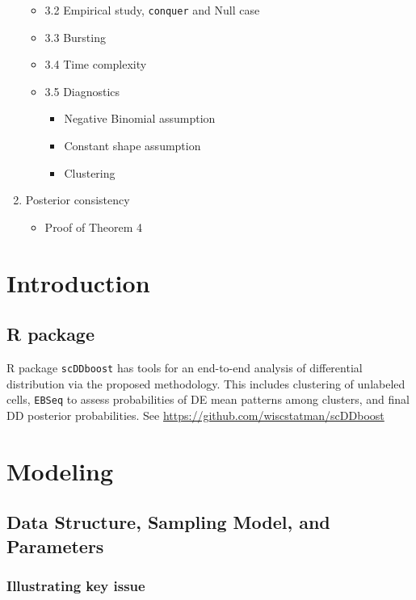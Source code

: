 \documentclass[aoas,preprint]{imsart}
\begin{document}
\begin{enumerate}
\begin{itemize}
   \item 3.2 Empirical study, \verb+conquer+ and Null case
   \item 3.3 Bursting
   \item 3.4 Time complexity
   \item {3.5 Diagnostics}
    \begin{itemize}
    \item {Negative Binomial assumption}
    \item {Constant shape assumption}
    \item {Clustering}
    \end{itemize}
   \end{itemize}
\item Posterior consistency
  \begin{itemize}
   \item Proof of Theorem 4
  \end{itemize}
\end{enumerate}


\clearpage

\section{Introduction}


\subsection{R package}

 R package \texttt{scDDboost} has tools for an end-to-end analysis of differential distribution
via the proposed methodology. This includes clustering of unlabeled cells, \verb+EBSeq+ to assess
 probabilities of DE mean patterns among clusters,  and final DD posterior probabilities. 
See \url {https://github.com/wiscstatman/scDDboost}



\section{Modeling}

\subsection{Data Structure, Sampling Model, and Parameters}

\subsubsection*{{\bf Illustrating key issue}}
\end{document}
